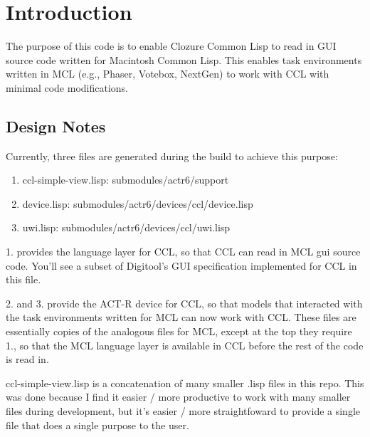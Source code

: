 \documentclass[12pt]{article} %
\begin{document}

\tableofcontents %

\newpage %


\section{Introduction} %

The purpose of this code is to enable Clozure Common Lisp to read in GUI source code written for Macintosh Common Lisp. This enables task environments written in MCL (e.g., Phaser, Votebox, NextGen) to work with CCL with minimal code modifications. 

\subsection{Design Notes}

Currently, three files are generated during the build to achieve this purpose:
\begin{enumerate}
\item ccl-simple-view.lisp: submodules/actr6/support
\item device.lisp: submodules/actr6/devices/ccl/device.lisp
\item uwi.lisp: submodules/actr6/devices/ccl/uwi.lisp
\end{enumerate}

1. provides the language layer for CCL, so that CCL can read in MCL gui source code. You'll see a subset of Digitool's GUI specification implemented for CCL in this file.

2. and 3. provide the ACT-R device for CCL, so that models that interacted with the task environments written for MCL can now work with CCL. These files are essentially copies of the analogous files for MCL, except at the top they require 1., so that the MCL language layer is available in CCL before the rest of the code is read in.

ccl-simple-view.lisp is a concatenation of many smaller .lisp files in this repo. This was done because I find it easier / more productive to work with many smaller files during development, but it's easier / more straightfoward to provide a single file that does a single purpose to the user. 
\end{document}
